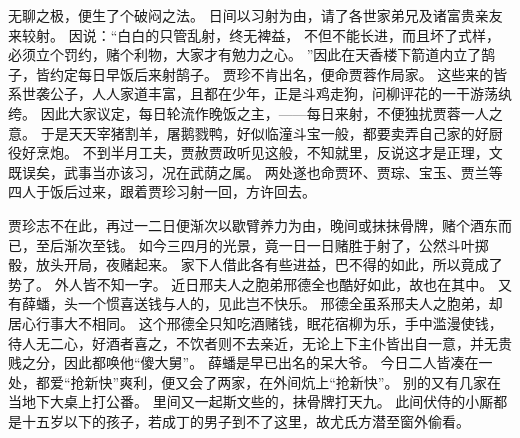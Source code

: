 无聊之极，便生了个破闷之法。
日间以习射为由，请了各世家弟兄及诸富贵亲友来较射。
因说：“白白的只管乱射，终无裨益，
不但不能长进，而且坏了式样，必须立个罚约，赌个利物，大家才有勉力之心。
”因此在天香楼下箭道内立了鹄子，皆约定每日早饭后来射鹄子。
贾珍不肯出名，便命贾蓉作局家。
这些来的皆系世袭公子，人人家道丰富，且都在少年，正是斗鸡走狗，问柳评花的一干游荡纨绔。
因此大家议定，每日轮流作晚饭之主，——每日来射，不便独扰贾蓉一人之意。
于是天天宰猪割羊，屠鹅戮鸭，好似临潼斗宝一般，都要卖弄自己家的好厨役好烹炮。
不到半月工夫，贾赦贾政听见这般，不知就里，反说这才是正理，文既误矣，武事当亦该习，况在武荫之属。
两处遂也命贾环、贾琮、宝玉、贾兰等四人于饭后过来，跟着贾珍习射一回，方许回去。
\par
贾珍志不在此，再过一二日便渐次以歇臂养力为由，晚间或抹抹骨牌，赌个酒东而已，至后渐次至钱。
如今三四月的光景，竟一日一日赌胜于射了，公然斗叶掷骰，放头开局，夜赌起来。
家下人借此各有些进益，巴不得的如此，所以竟成了势了。
外人皆不知一字。
近日邢夫人之胞弟邢德全也酷好如此，故也在其中。
又有薛蟠，头一个惯喜送钱与人的，见此岂不快乐。
邢德全虽系邢夫人之胞弟，却居心行事大不相同。
这个邢德全只知吃酒赌钱，眠花宿柳为乐，手中滥漫使钱，待人无二心，好酒者喜之，不饮者则不去亲近，无论上下主仆皆出自一意，并无贵贱之分，因此都唤他“傻大舅”。
薛蟠是早已出名的呆大爷。
今日二人皆凑在一处，都爱“抢新快”爽利，便又会了两家，在外间炕上“抢新快”。
别的又有几家在当地下大桌上打公番。
里间又一起斯文些的，抹骨牌打天九。
此间伏侍的小厮都是十五岁以下的孩子，若成丁的男子到不了这里，故尤氏方潜至窗外偷看。
